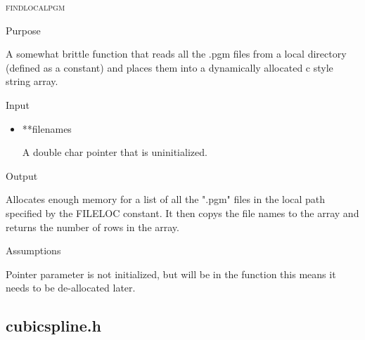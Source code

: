 \documentclass[pdftex, 11pt]{article}
\begin{document}
\begin{description}
\begin{description}
		\end{description}



	\item{\textsc{findlocalpgm}}
		\begin{description}
			\item{Purpose}

				A somewhat brittle function that reads all the .pgm files from a local
				directory (defined as a constant) and places them into a dynamically
				allocated c style string array.

			\item{Input}

				\begin{itemize}

					\item{**filenames}
						
						A double char pointer that is uninitialized.

				\end{itemize}

			\item{Output}

				Allocates enough memory for a list of all the ".pgm" files
				in the local path specified by the FILELOC constant.  It
				then copys the file names to the array and returns the
				number of rows in the array.

			\item{Assumptions}

				Pointer parameter is not initialized, but will be in the function
				this means it needs to be de-allocated later.

		\end{description}


\end{description}

\subsection{cubicspline.h}
\end{document}
